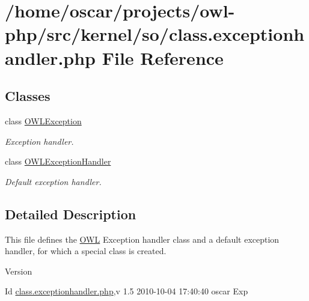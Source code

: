 \section{/home/oscar/projects/owl-\/php/src/kernel/so/class.exceptionhandler.php File Reference}
\label{class_8exceptionhandler_8php}
\subsection*{Classes}
\begin{DoxyCompactItemize}
\item 
class \hyperlink{classOWLException}{OWLException}
\begin{DoxyCompactList}\small\item\em Exception handler. \item\end{DoxyCompactList}\item 
class \hyperlink{classOWLExceptionHandler}{OWLExceptionHandler}
\begin{DoxyCompactList}\small\item\em Default exception handler. \item\end{DoxyCompactList}\end{DoxyCompactItemize}


\subsection{Detailed Description}
This file defines the \hyperlink{classOWL}{OWL} Exception handler class and a default exception handler, for which a special class is created. \begin{DoxyVersion}{Version}

\end{DoxyVersion}
\begin{DoxyParagraph}{Id}
\hyperlink{class_8exceptionhandler_8php}{class.exceptionhandler.php},v 1.5 2010-\/10-\/04 17:40:40 oscar Exp 
\end{DoxyParagraph}
